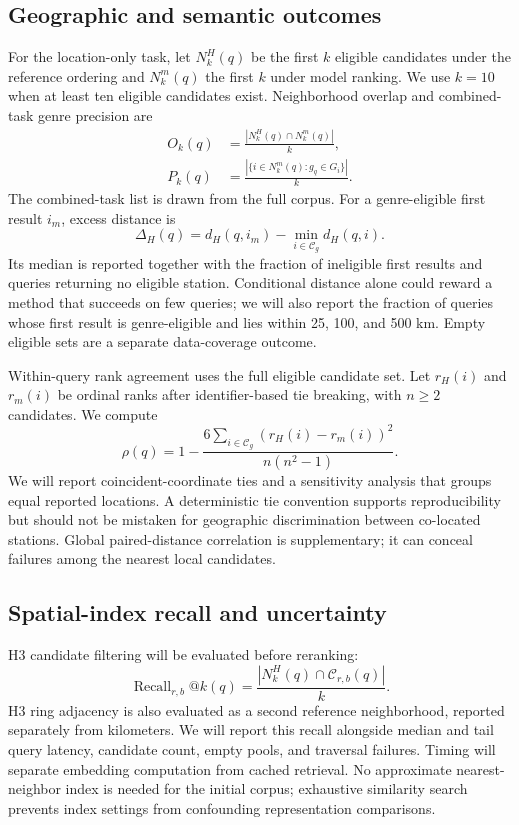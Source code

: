 \documentclass[10pt]{article}
\begin{document}
\subsection{Geographic and semantic outcomes}
For the location-only task, let $N_k^H(q)$ be the first $k$ eligible candidates under the reference ordering and $N_k^m(q)$ the first $k$ under model ranking. We use $k=10$ when at least ten eligible candidates exist. Neighborhood overlap and combined-task genre precision are
\begin{align}
O_k(q)&=\frac{|N_k^H(q)\cap N_k^m(q)|}{k},\label{eq:overlap}\\
P_k(q)&=\frac{|\{i\in N_k^m(q):g_q\in G_i\}|}{k}.
\label{eq:precision}
\end{align}
The combined-task list is drawn from the full corpus. For a genre-eligible first result $i_m$, excess distance is
\begin{equation}
\Delta_H(q)=d_H(q,i_m)-\min_{i\in\mathcal C_g}d_H(q,i).
\label{eq:regret}
\end{equation}
Its median is reported together with the fraction of ineligible first results and queries returning no eligible station. Conditional distance alone could reward a method that succeeds on few queries; we will also report the fraction of queries whose first result is genre-eligible and lies within 25, 100, and 500 km. Empty eligible sets are a separate data-coverage outcome.

Within-query rank agreement uses the full eligible candidate set. Let $r_H(i)$ and $r_m(i)$ be ordinal ranks after identifier-based tie breaking, with $n\geq2$ candidates. We compute
\begin{equation}
\rho(q)=1-\frac{6\sum_{i\in\mathcal C_g}(r_H(i)-r_m(i))^2}{n(n^2-1)}.
\label{eq:spearman}
\end{equation}
We will report coincident-coordinate ties and a sensitivity analysis that groups equal reported locations. A deterministic tie convention supports reproducibility but should not be mistaken for geographic discrimination between co-located stations. Global paired-distance correlation is supplementary; it can conceal failures among the nearest local candidates.

\subsection{Spatial-index recall and uncertainty}
H3 candidate filtering will be evaluated before reranking:
\begin{equation}
\operatorname{Recall}_{r,b}@k(q)=
\frac{|N_k^H(q)\cap\mathcal C_{r,b}(q)|}{k}.
\label{eq:h3recall}
\end{equation}
H3 ring adjacency is also evaluated as a second reference neighborhood, reported separately from kilometers. We will report this recall alongside median and tail query latency, candidate count, empty pools, and traversal failures. Timing will separate embedding computation from cached retrieval. No approximate nearest-neighbor index is needed for the initial corpus; exhaustive similarity search prevents index settings from confounding representation comparisons.
\end{document}

